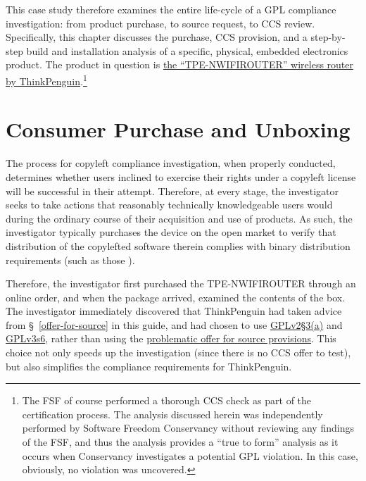This case study therefore examines the entire life-cycle of a GPL compliance
investigation: from product purchase, to source request, to CCS review.
Specifically, this chapter discusses the purchase, CCS provision, and a
step-by-step build and installation analysis of a specific, physical,
embedded electronics product.  The product in question is
\href{https://www.thinkpenguin.com/gnu-linux/free-software-wireless-n-broadband-router-gnu-linux-tpe-nwifirouter}{the
  ``TPE-NWIFIROUTER'' wireless router by ThinkPenguin}.\footnote{The FSF of
  course performed a thorough CCS check as part of the certification process.
  The analysis discussed herein was independently performed by Software
  Freedom Conservancy without reviewing any findings of the FSF, and thus the
  analysis provides a ``true to form'' analysis as it occurs when Conservancy
  investigates a potential GPL violation.  In this case, obviously, no
  violation was uncovered.}

\section{Consumer Purchase and Unboxing}

The process for copyleft compliance investigation, when properly conducted,
determines whether users inclined to exercise their rights under a copyleft
license will be successful in their attempt.  Therefore, at every stage, the
investigator seeks to take actions that reasonably technically knowledgeable
users would during the ordinary course of their acquisition and use of
products.  As such, the investigator typically purchases the device on the
open market to verify that distribution of the copylefted software therein
complies with binary distribution requirements (such as those
).


\label{thinkpenguin-included-ccs}

Therefore, the investigator first purchased the TPE-NWIFIROUTER through an
online order, and when the package arrived, examined the contents of the box.
The investigator immediately discovered that ThinkPenguin had taken advice
from \S~\ref{offer-for-source} in this guide, and had chosen to use
\hyperref[GPLv2s3a]{GPLv2\S3(a)} and \hyperref[GPLv3s6]{GPLv3s6}, rather than
using the \hyperref[offer-for-source]{problematic offer for source
  provisions}.  This choice not only speeds up the investigation (since there
is no CCS offer to test), but also simplifies the compliance requirements for
ThinkPenguin.

